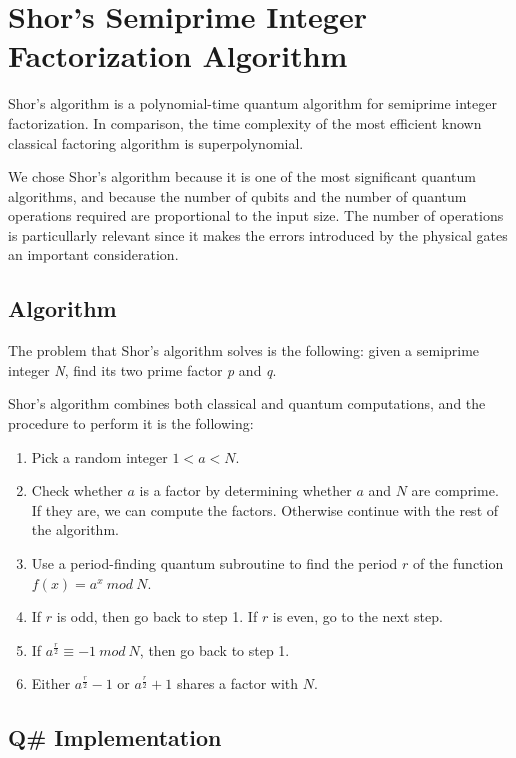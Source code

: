 %
%
\chapter {Shor's Semiprime Integer Factorization Algorithm}

Shor's algorithm is a polynomial-time quantum algorithm for semiprime integer factorization. In comparison, the time complexity of the most efficient known classical factoring algorithm is superpolynomial.

We chose Shor's algorithm because it is one of the most significant quantum algorithms, and because the number of qubits and the number of quantum operations required are proportional to the input size. The number of operations is particullarly relevant since it makes the errors introduced by the physical gates an important consideration.

\section{Algorithm}

The problem that Shor's algorithm solves is the following: given a semiprime integer \textit{N}, find its two prime factor \textit{p} and \textit{q}.

Shor's algorithm combines both classical and quantum computations, and the procedure to perform it is the following:
\begin{enumerate}
    \item Pick a random integer $1 < a < N$.
    \item Check whether $a$ is a factor by determining whether $a$ and $N$ are comprime. If they are, we can compute the factors. Otherwise continue with the rest of the algorithm.
    \item Use a period-finding quantum subroutine to find the period $r$ of the function $f(x)=a^{x} \ mod \ N$.
    \item If $r$ is odd, then go back to step 1. If $r$ is even, go to the next step.
    \item If $a^{\frac{r}{2}} \equiv -1  \ mod \ N$, then go back to step 1.
    \item Either $a^{\frac{r}{2}} - 1$ or $a^{\frac{r}{2}} + 1$ shares a factor with $N$.
\end{enumerate}

\section{Q\# Implementation}

